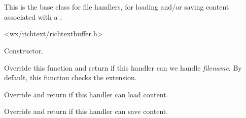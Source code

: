 \section{}\label{wxrichtextfilehandler}

This is the base class for file handlers, for loading and/or saving content
associated with a .




<wx/richtext/richtextbuffer.h>





\label{wxrichtextfilehandlerwxrichtextfilehandler}


Constructor.

\label{wxrichtextfilehandlercanhandle}


Override this function and return \true if this handler can we handle {\it filename}. By default,
this function checks the extension.

\label{wxrichtextfilehandlercanload}


Override and return \true if this handler can load content.

\label{wxrichtextfilehandlercansave}


Override and return \true if this handler can save content.

\label{wxrichtextfilehandlerdoloadfile}


